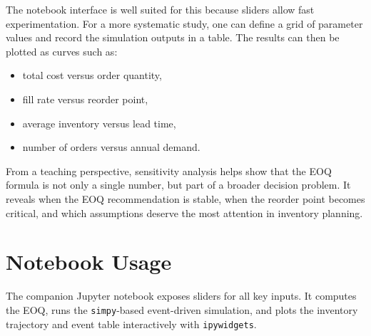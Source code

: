 \documentclass[11pt]{article}
\begin{document}
The notebook interface is well suited for this because sliders allow fast experimentation. For a more systematic study, one can define a grid of parameter values and record the simulation outputs in a table. The results can then be plotted as curves such as:
\begin{itemize}
  \item total cost versus order quantity,
  \item fill rate versus reorder point,
  \item average inventory versus lead time,
  \item number of orders versus annual demand.
\end{itemize}

From a teaching perspective, sensitivity analysis helps show that the EOQ formula is not only a single number, but part of a broader decision problem. It reveals when the EOQ recommendation is stable, when the reorder point becomes critical, and which assumptions deserve the most attention in inventory planning.

\section{Notebook Usage}
The companion Jupyter notebook exposes sliders for all key inputs. It computes the EOQ, runs the \texttt{simpy}-based event-driven simulation, and plots the inventory trajectory and event table interactively with \texttt{ipywidgets}.
\end{document}
